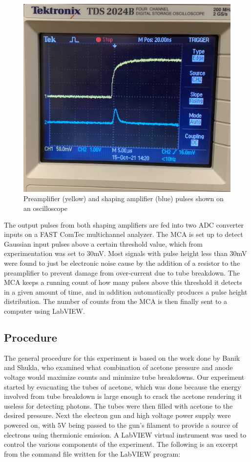 \begin{figure}[h!]
  \centering
  \includegraphics[scale=0.15]{Figs/pulses.png}
  \caption{Preamplifier (yellow) and shaping amplifier (blue) pulses shown on an oscilloscope}
  \label{fig:pulses}
\end{figure}

The output pulses from both shaping amplifiers are fed into two ADC converter inputs on a FAST ComTec multichannel analyzer. The MCA is set up to detect Gaussian input pulses above a certain threshold 
value, which from experimentation was set to 30mV. Most signals with pulse height less than 30mV were found to just be electronic noise cause by the addition of a resistor to the preamplifier
to prevent damage from over-current due to tube breakdown. The MCA keeps a running count of how many pulses above this threshold it detects in a given amount of time, and in addition 
automatically produces a pulse height distribution. The number of counts from the MCA is then finally sent to a computer using LabVIEW. 

\subsection{Procedure}

The general procedure for this experiment is based on the work done by Banik and Shukla, who examined what combination of acetone pressure and anode voltage 
would maximize counts and minimize tube breakdowns\cite{banik2005optimal}. Our experiment started by evacuating the tubes of acetone, which was done because the energy involved from tube breakdown is large
enough to crack the acetone rendering it useless for detecting photons\cite{banik2005optimal}. The tubes were then filled with acetone to the desired pressure. Next the electron gun and 
high voltage power supply were powered on, with 5V being passed to the gun's filament to provide a source of electrons using thermionic emission. A LabVIEW virtual instrument was used 
to control the various components of the experiment. The following is an excerpt from the command file written for the LabVIEW program:


